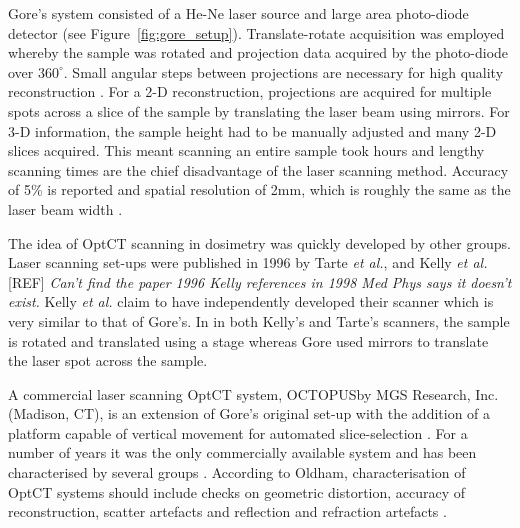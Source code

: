 \documentclass[12pt]{article}
\begin{document}
Gore's system consisted of a  He-Ne laser source and large area photo-diode detector (see Figure~\ref{fig:gore_setup}). Translate-rotate acquisition was employed whereby the sample was rotated and projection data  acquired  by the photo-diode over $360^{\circ}$. Small angular steps between projections are necessary for high quality reconstruction \cite{russ2002image}. For a 2-D reconstruction, projections are acquired for multiple spots across a slice of the sample by translating the laser beam using mirrors. For 3-D information, the sample height  had to be manually adjusted and many 2-D slices acquired. This meant scanning an entire sample took  hours and lengthy scanning times are the chief disadvantage of the laser scanning method.  Accuracy of 5\% is reported and spatial resolution of 2mm, which is roughly the same as the laser beam width \cite{Gore:1999tg}.

The idea of OptCT scanning in dosimetry was quickly developed by other groups. Laser scanning set-ups were published in 1996 by Tarte \textit{et al.},  \cite{Tarte:2006} and Kelly \textit{et al.} [REF]
\textit{Can't find the paper 1996 Kelly references in 1998 \cite{Kelly:1998} Med Phys says it doesn't exist.}
Kelly \textit{et al.} claim to have independently developed their scanner which is very similar to that of Gore's. In in both Kelly's and Tarte's  scanners, the sample is rotated and translated using a stage whereas Gore used mirrors to translate the laser spot across the sample. 


A commercial laser scanning OptCT system, OCTOPUS\texttrademark by MGS Research, Inc.
(Madison, CT),  is an extension of Gore's original set-up with the addition of a platform capable of vertical movement for automated slice-selection \cite{Islam:2003gs}. For a number of years it was the only commercially available system and has been characterised by several groups \cite{Xu:2003cc, Islam:2003gs, Xu:2004iv, Sakhalkar:2009hb}. According to Oldham, characterisation of OptCT systems should include checks on geometric distortion, accuracy of reconstruction, scatter artefacts and reflection and refraction artefacts \cite{Oldham:2004cj}.


 

\end{document}
